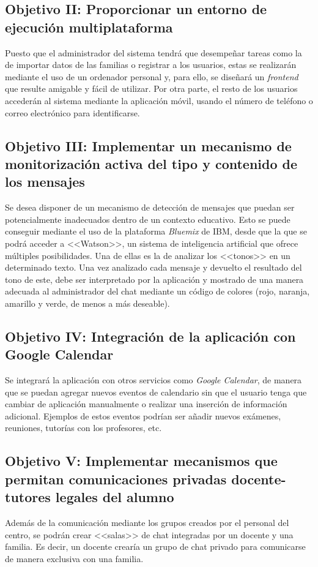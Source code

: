 \subsection{Objetivo II: Proporcionar un entorno de ejecución multiplataforma}
Puesto que el administrador del sistema tendrá que desempeñar tareas como la de importar datos de las familias o registrar a los usuarios, estas se realizarán mediante el uso de un ordenador personal y, para ello, se diseñará un \textit{frontend} que resulte amigable y fácil de utilizar. Por otra parte, el resto de los usuarios accederán al sistema mediante la aplicación móvil, usando el número de teléfono o correo electrónico para identificarse.

\subsection{Objetivo III: Implementar un mecanismo de monitorización activa del tipo y contenido de los mensajes}
Se desea disponer de un mecanismo de detección de mensajes que puedan ser potencialmente inadecuados dentro de un contexto educativo. Esto se puede conseguir mediante el uso de la plataforma \textit{Bluemix} de IBM, desde que la que se podrá acceder a <<Watson>>, un sistema de inteligencia artificial que ofrece múltiples posibilidades. Una de ellas es la de analizar los <<tonos>> en un determinado texto. Una vez analizado cada mensaje y devuelto el resultado del tono de este, debe ser interpretado por la aplicación y mostrado de una manera adecuada al administrador del chat mediante un código de colores (rojo, naranja, amarillo y verde, de menos a más deseable).

\subsection{Objetivo IV: Integración de la aplicación con Google Calendar}
Se integrará la aplicación con otros servicios como \textit{Google Calendar}, de manera que se puedan agregar nuevos eventos de calendario sin que el usuario tenga que cambiar de aplicación manualmente o realizar una inserción de información adicional. Ejemplos de estos eventos podrían ser añadir nuevos exámenes, reuniones, tutorías con los profesores, etc.

\subsection{Objetivo V: Implementar mecanismos que permitan comunicaciones privadas docente-tutores legales del alumno}
Además de la comunicación mediante los grupos creados por el personal del centro, se podrán crear <<salas>> de chat integradas por un docente y una familia. Es decir, un docente crearía un grupo de chat privado para comunicarse de manera exclusiva con una familia.

